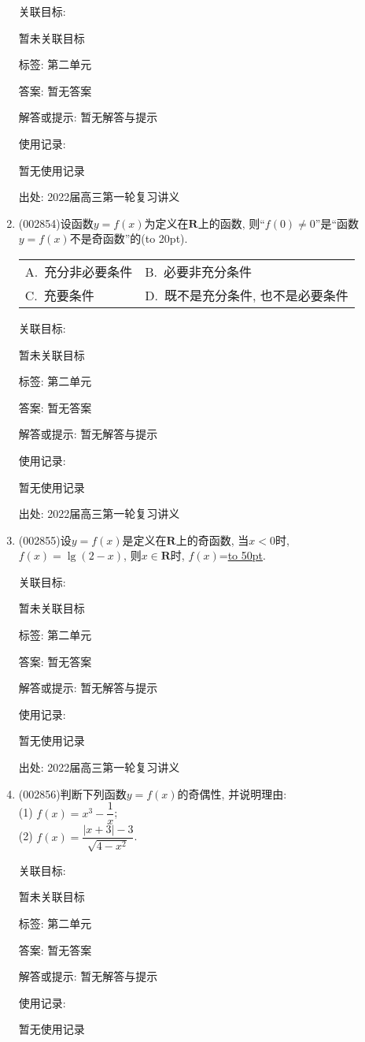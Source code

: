\documentclass[10pt,a4paper]{article}
\newcommand{\blank}[1]{\underline{\hbox to #1pt{}}}
\newcommand{\bracket}[1]{(\hbox to #1pt{})}
\newcommand{\twoch}[4]{\par\begin{tabular}{p{.46\textwidth}p{.46\textwidth}}
A.~#1& B.~#2\\
C.~#3& D.~#4
\end{tabular}}
\begin{document}
\begin{enumerate}[1.]
关联目标:

暂未关联目标



标签: 第二单元

答案: 暂无答案

解答或提示: 暂无解答与提示

使用记录:

暂无使用记录


出处: 2022届高三第一轮复习讲义
\item { (002854)}设函数$y=f(x)$为定义在$\mathbf{R}$上的函数, 则``$f(0)\ne 0$''是``函数$y=f(x)$不是奇函数''的\bracket{20}.
\twoch{充分非必要条件}{必要非充分条件}{充要条件}{既不是充分条件, 也不是必要条件}


关联目标:

暂未关联目标



标签: 第二单元

答案: 暂无答案

解答或提示: 暂无解答与提示

使用记录:

暂无使用记录


出处: 2022届高三第一轮复习讲义
\item { (002855)}设$y=f(x)$是定义在$\mathbf{R}$上的奇函数, 当$x<0$时, $f(x)=\lg(2-x)$, 则$x\in \mathbf{R}$时, $f(x)$=\blank{50}.


关联目标:

暂未关联目标



标签: 第二单元

答案: 暂无答案

解答或提示: 暂无解答与提示

使用记录:

暂无使用记录


出处: 2022届高三第一轮复习讲义
\item { (002856)}判断下列函数$y=f(x)$的奇偶性, 并说明理由:\\
(1) $f(x)=x^3-\dfrac 1x$;\\
(2) $f(x)=\dfrac{|x+3|-3}{\sqrt{4-x^2}}$.


关联目标:

暂未关联目标



标签: 第二单元

答案: 暂无答案

解答或提示: 暂无解答与提示

使用记录:

暂无使用记录



\end{enumerate}
\end{document}
